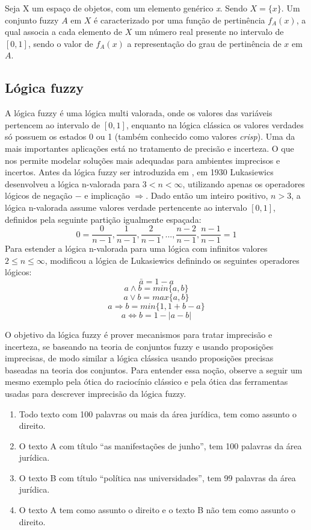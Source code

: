 Seja X um espaço de objetos, com um elemento genérico {\it x\/}.  Sendo $X= \big\{x\big\}$.
Um conjunto fuzzy $A$ em $X$ é caracterizado por uma função de pertinência $f_A(x)$, a qual associa
a cada elemento de $X$ um número real presente no intervalo de $[0,1]$, sendo o valor de $f_A(x)$ a
representação do grau de pertinência de $x$ em $A$.

\subsection{Lógica fuzzy}

A lógica fuzzy é uma lógica multi valorada, onde os valores das variáveis pertencem ao intervalo de
$[0,1]$, enquanto na lógica clássica os valores verdades só possuem os estados 0 ou 1 (também
conhecido como valores {\it crisp\/}). Uma da mais importantes aplicações está no tratamento de
precisão e incerteza. O que nos permite modelar soluções mais adequadas para ambientes imprecisos
e incertos.  Antes da lógica fuzzy ser introduzida em \cite{Zadeh1965}, em 1930
Lukasiewics\cite{Chen2000} desenvolveu a lógica n-valorada para $3 < n < \infty$, utilizando apenas
os operadores lógicos de negação $-$ e implicação $\Rightarrow$. Dado então um inteiro positivo, $n
> 3$, a lógica n-valorada assume valores verdade pertencente ao intervalo $[0,1]$, definidos pela
seguinte partição igualmente espaçada: $$0 =  \frac{0}{n-1},
\frac{1}{n-1},\frac{2}{n-1},...,\frac{n-2}{n-1},\frac{n-1}{n-1} = 1$$ Para estender a lógica
n-valorada para uma lógica com infinitos valores $2 \leq n \leq \infty$, \cite{Zadeh1965} modificou
a lógica de Lukasiewics definindo os seguintes operadores lógicos: $$\bar{a} = 1 -a$$ $$a \wedge b =
min\{a,b\}$$ $$a \vee b = max\{a,b\}$$ $$a \Rightarrow b = min\{1, 1+b-a\}$$ $$a \Leftrightarrow  b
= 1 - |a-b|$$

O objetivo da lógica fuzzy é prover mecanismos para tratar imprecisão e incerteza, se baseando na
teoria de conjuntos fuzzy e usando proposições imprecisas, de modo similar a lógica clássica usando
proposições precisas baseadas na teoria dos conjuntos.  Para entender essa noção, observe
a seguir um mesmo exemplo pela ótica do raciocínio clássico e pela ótica das ferramentas usadas para descrever
imprecisão da lógica fuzzy.  

\begin{enumerate}[label=\alph*)] 
\item Todo texto com 100 palavras ou mais da área jurídica, tem como assunto o direito. 
\item O texto A com título ``as manifestações de junho'', tem 100 palavras da área jurídica.  
\item O texto B com título ``política nas universidades'', tem 99 palavras da área jurídica.  
\item O texto A tem como assunto o direito e o texto B não tem como assunto o direito.  
\end{enumerate} 

